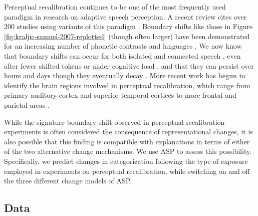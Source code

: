\documentclass[
  11pt,
  man,floatsintext]{apa6}
\begin{document}
Perceptual recalibration continues to be one of the most frequently used paradigm in research on adaptive speech perception. A recent review cites over 200 studies using variants of this paradigm \autocite{theodore2021}. Boundary shifts like those in Figure \ref{fig:kraljic-samuel-2007-replotted} (though often larger) have been demonstrated for an increasing number of phonetic contrasts and languages \autocites[e.g.,][]{hanulikova-weber2012,kraljic-samuel2005,kraljic-samuel2006,reinisch2013,sumner2011,vroomen2007}. We now know that boundary shifts can occur for both isolated and connected speech \autocites[e.g.,][]{eisner-mcqueen2005,reinisch-holt2013}, even after fewer shifted tokens \autocites[e.g., as few as four,][]{liu-jaeger2018,liu-jaeger2019} or under cognitive load \autocites{baart-vroomen2010,zhang-samuel2014}[but see][]{samuel2016}, and that they can persist over hours and days \autocite{eisner-mcqueen2006,vroomen-baart2009,saltzman-myers2021} though they eventually decay \autocite{samuel2021,zheng-samuel2023}. More recent work has begun to identify the brain regions involved in perceptual recalibration, which range from primary auditory cortex and superior temporal cortices to more frontal and parietal areas \autocites{bonte2017,kilianhutten2011,myers-mesite2014,ullas2020,luthra2020a}[for review, see][]{guediche2014}.

While the signature boundary shift observed in perceptual recalibration experiments is often considered the consequence of representational changes, it is also possible that this finding is compatible with explanations in terms of either of the two alternative change mechanisms. We use ASP to assess this possibility. Specifically, we predict changes in categorization following the type of exposure employed in experiments on perceptual recalibration, while switching on and off the three different change models of ASP.

\hypertarget{data}{%
\subsection{Data}\label{data}}
\end{document}
